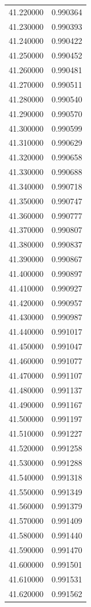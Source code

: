\begin{tabular}{rr}
41.220000 & 0.990364 \\
41.230000 & 0.990393 \\
41.240000 & 0.990422 \\
41.250000 & 0.990452 \\
41.260000 & 0.990481 \\
41.270000 & 0.990511 \\
41.280000 & 0.990540 \\
41.290000 & 0.990570 \\
41.300000 & 0.990599 \\
41.310000 & 0.990629 \\
41.320000 & 0.990658 \\
41.330000 & 0.990688 \\
41.340000 & 0.990718 \\
41.350000 & 0.990747 \\
41.360000 & 0.990777 \\
41.370000 & 0.990807 \\
41.380000 & 0.990837 \\
41.390000 & 0.990867 \\
41.400000 & 0.990897 \\
41.410000 & 0.990927 \\
41.420000 & 0.990957 \\
41.430000 & 0.990987 \\
41.440000 & 0.991017 \\
41.450000 & 0.991047 \\
41.460000 & 0.991077 \\
41.470000 & 0.991107 \\
41.480000 & 0.991137 \\
41.490000 & 0.991167 \\
41.500000 & 0.991197 \\
41.510000 & 0.991227 \\
41.520000 & 0.991258 \\
41.530000 & 0.991288 \\
41.540000 & 0.991318 \\
41.550000 & 0.991349 \\
41.560000 & 0.991379 \\
41.570000 & 0.991409 \\
41.580000 & 0.991440 \\
41.590000 & 0.991470 \\
41.600000 & 0.991501 \\
41.610000 & 0.991531 \\
41.620000 & 0.991562 \\

\end{tabular}
